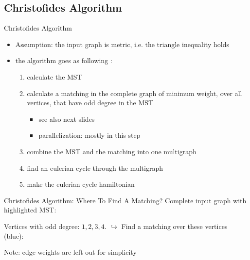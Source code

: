 \subsection{Christofides Algorithm}

\begin{frame}[t]{Christofides Algorithm}
  \begin{itemize}
    \item Assumption: the input graph is metric, i.e. the triangle inequality holds
    \pause
    \item the algorithm goes as following \cite{christofides_worst-case_1976}:
      \begin{enumerate}
        \item calculate the MST
        \pause
        \item calculate a matching in the complete graph of minimum weight, over all vertices, that have odd degree in the MST
          \begin{itemize}
            \item see also next slides
          \pause
            \item parallelization: mostly in this step
          \end{itemize}
        \pause
        \item combine the MST and the matching into one multigraph
        \pause
        \item find an eulerian cycle through the multigraph
        \pause
        \item make the eulerian cycle hamiltonian
      \end{enumerate}
  \end{itemize}
\end{frame}

\begin{frame}[t]{Christofides Algorithm: Where To Find A Matching?}
  Complete input graph with highlighted MST:


  Vertices with odd degree: $1,2,3,4$. $\hookrightarrow$ Find a matching over these vertices (blue):


  Note: edge weights are left out for simplicity
\end{frame}

